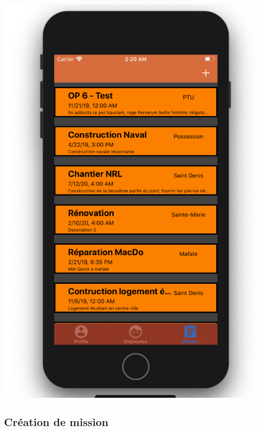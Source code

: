 \documentclass{article}
\begin{document}
\begin{center}
    \includegraphics[scale=0.15]{listeMIOS.png}
\end{center}

\subsection{Création de mission}
\end{document}
